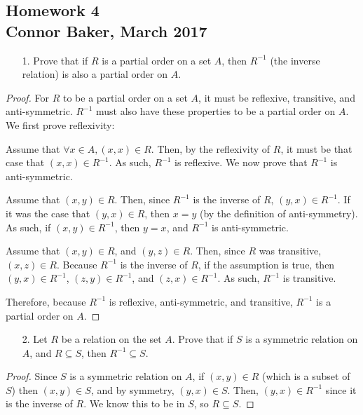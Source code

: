 \documentclass[10pt]{article}
\theoremstyle{definition}
\theoremstyle{plain}
\begin{document}
\begin{center}
  \subsection*{Homework 4\\Connor Baker, March 2017}
\end{center}

\begin{enumerate}
\item[1.] Prove that if $R$ is a partial order on a set $A$, then $R^{-1}$ (the inverse relation) is also a partial order on $A$.
\end{enumerate}

\begin{proof}
  For $R$ to be a partial order on a set $A$, it must be reflexive, transitive, and anti-symmetric. $R^{-1}$ must also have these properties to be a partial order on $A$. We first prove reflexivity:

  Assume that $\forall x\in A, (x,x)\in R$. Then, by the reflexivity of $R$, it must be that case that $(x,x)\in R^{-1}$. As such, $R^{-1}$ is reflexive. We now prove that $R^{-1}$ is anti-symmetric.

  Assume that $(x,y)\in R$. Then, since $R^{-1}$ is the inverse of $R$, $(y,x)\in R^{-1}$. If it was the case that $(y,x)\in R$, then $x=y$ (by the definition of anti-symmetry). As such, if $(x,y)\in R^{-1}$, then $y=x$, and $R^{-1}$ is anti-symmetric.

  Assume that $(x,y)\in R$, and $(y,z)\in R$. Then, since $R$ was transitive, $(x,z)\in R$. Because $R^{-1}$ is the inverse of $R$, if the assumption is true, then $(y,x)\in R^{-1}$, $(z,y)\in R^{-1}$, and $(z,x)\in R^{-1}$. As such, $R^{-1}$ is transitive.

  Therefore, because $R^{-1}$ is reflexive, anti-symmetric, and transitive, $R^{-1}$ is a partial order on $A$.
\end{proof}



\pagebreak



\begin{enumerate}
  \item[2.] Let $R$ be a relation on the set $A$.  Prove that if $S$ is a symmetric relation on $A$, and $R \subseteq S$, then $R^{-1} \subseteq S$.
\end{enumerate}

\begin{proof}
  Since $S$ is a symmetric relation on $A$, if $(x,y)\in R$ (which is a subset of $S$) then $(x,y)\in S$, and by symmetry, $(y,x)\in S$. Then, $(y,x)\in R^{-1}$ since it is the inverse of $R$. We know this to be in $S$, so $R \subseteq S$.
\end{proof}
\end{document}
